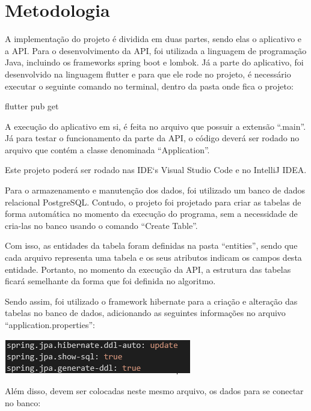 \documentclass[conference]{IEEEtran}
\begin{document}
\section*{Metodologia}
A implementação do projeto é dividida em duas partes, sendo elas o aplicativo e a API. Para o desenvolvimento da API, foi utilizada a linguagem de programação Java, incluindo os frameworks spring boot e lombok. Já a parte do aplicativo, foi desenvolvido na linguagem flutter e para que ele rode no projeto, é necessário executar o seguinte comando no terminal, dentro da pasta onde fica o projeto:

\vspace{3mm}
\centerline{flutter pub get}
\vspace{3mm}
A execução do aplicativo em si, é feita no arquivo que possuir a extensão “.main”. Já para testar o funcionamento da parte da API, o código deverá ser rodado no arquivo que contém a classe denominada “Application”.

Este projeto poderá ser rodado nas IDE`s Visual Studio Code e no IntelliJ IDEA.

Para o armazenamento e manutenção dos dados, foi utilizado um banco de dados relacional PostgreSQL. Contudo, o projeto foi projetado para criar as tabelas de forma automática no momento da execução do programa, sem a necessidade de cria-las no banco usando o comando “Create Table”. 

Com isso, as entidades da tabela foram definidas na pasta “entities”, sendo que cada arquivo representa uma tabela e os seus atributos indicam os campos desta entidade. Portanto, no momento da execução da API, a estrutura das tabelas ficará semelhante da forma que foi definida no algoritmo.

Sendo assim, foi utilizado o framework hibernate para a criação e alteração das tabelas no banco de dados, adicionando as seguintes informações no arquivo “application.properties”:

\vspace{7mm}
\centerline{\includegraphics{AlgoritmoHibernate.png}}
\vspace{7mm}

Além disso, devem ser colocadas neste mesmo arquivo, os dados para se conectar no banco:
\end{document}
